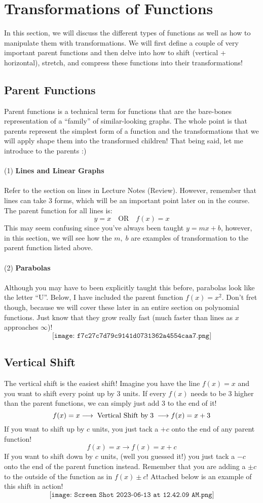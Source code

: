 \section{Transformations of Functions}
In this section, we will discuss the different types of functions as well as how to manipulate them with transformations. We will first define a couple of very important parent functions and then delve into how to shift (vertical + horizontal), stretch, and compress these functions into their transformations!
\subsection{Parent Functions}
Parent functions is a technical term for functions that are the bare-bones representation of a ``family'' of similar-looking graphs. The whole point is that parents represent the simplest form of a function and the transformations that we will apply shape them into the transformed children! That being said, let me introduce to the parents :)\\
\\
(1) \textbf{Lines and Linear Graphs}\\
\\
Refer to the section on lines in Lecture Notes (Review). However, remember that lines can take 3 forms, which will be an important point later on in the course. The parent function for all lines is:
$$
y = x \quad \text{OR} \quad f(x) = x
$$
This may seem confusing since you've always been taught $y = mx + b$, however, in this section, we will see how the $m,\;b$ are examples of transformation to the parent function listed above.\\
\\
(2) \textbf{Parabolas}\\
\\
Although you may have to been explicitly taught this before, parabolas look like the letter ``U''. Below, I have included the parent function $f(x) = x^2$. Don't fret though, because we will cover these later in an entire section on polynomial functions. Just know that they grow really fast (much faster than lines as $x$ approaches $\infty$)!
$$
\texttt{[image: f7c27c7d79c9141d0731362a4554caa7.png]}
$$
\subsection{Vertical Shift}
The vertical shift is the easiest shift! Imagine you have the line $f(x) = x$ and you want to shift every point up by $3$ units. If every $f(x)$ needs to be $3$ higher than the parent functions, we can simply just add $3$ to the end of it!
$$
f(x) = x \longrightarrow\;\text{Vertical Shift by\;} 3\;\longrightarrow f(x) = x + 3 
$$
If you want to shift up by $c$ units, you just tack a $+c$ onto the end of any parent function! 
$$
f(x) = x \longrightarrow f(x) = x + c
$$
If you want to shift down by $c$ units, (well you guessed it!) you just tack a $-c$ onto the end of the parent function instead. Remember that you are adding a $\pm c$ to the outside of the function as in $f(x) \pm c$! Attached below is an example of this shift in action!
$$
\texttt{[image: Screen Shot 2023-06-13 at 12.42.09 AM.png]}
$$
